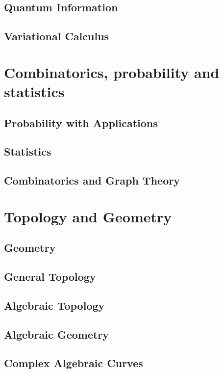 \documentclass[12pt]{report}
\begin{document}
\chapter{Quantum Information}\label{cha:quantum-information}
\chapter{Variational Calculus}\label{cha:variational-calculus}

\part{Combinatorics, probability and statistics}
\chapter{Probability with Applications}\label{cha:prob-with-appl}
\chapter{Statistics}\label{cha:statistics}
\chapter{Combinatorics and Graph Theory}\label{cha:comb-graph-theory}

\part{Topology and Geometry}
\chapter{Geometry}\label{cha:geometry}
\chapter{General Topology}\label{cha:general-topology}
\chapter{Algebraic Topology}\label{cha:algebraic-topology}
\chapter{Algebraic Geometry}\label{cha:algebraic-geometry}
\chapter{Complex Algebraic Curves}\label{cha:compl-algebr-curv}
\end{document}
